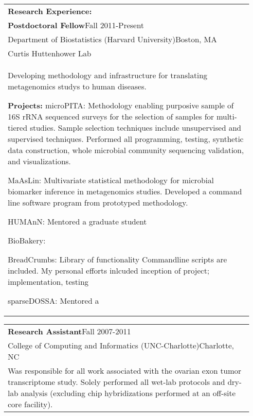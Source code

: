 \documentclass[12pt]{report}
\def\fullLength{6.5in}
\begin{document}
\begin{table}[!ht]
\begin{tabular}{p{\fullLength}}
\textbf{\Large Research Experience:}\\
\textbf{Postdoctoral Fellow}\hfill Fall 2011-Present\\
Department of Biostatistics (Harvard University)\hfill Boston, MA\\
Curtis Huttenhower Lab\\
Developing methodology and infrastructure for translating metagenomics studys to human diseases.

\textbf{Projects: }
microPITA: Methodology enabling purposive sample of 16S rRNA sequenced surveys for the selection of samples for multi-tiered studies. Sample selection techniques include unsupervised and supervised techniques. Performed all programming, testing,  synthetic data construction, whole microbial community sequencing validation, and visualizations.

MaAsLin: Multivariate statistical methodology for microbial biomarker inference in metagenomics studies. Developed a command line software program from prototyped methodology.

HUMAnN: Mentored a graduate student

BioBakery: 

BreadCrumbs: Library of functionality Commandline scripts are included. My personal efforts inlcuded inception of project; implementation, testing

sparseDOSSA: Mentored a 

\end{tabular}
\end{table}

\begin{table}[!ht]
\begin{tabular}{p{\fullLength}}
\textbf{Research Assistant}\hfill Fall 2007-2011\\
College of Computing and Informatics (UNC-Charlotte)\hfill Charlotte, NC\\
Was responsible for all work associated with the ovarian exon tumor transcriptome study. Solely performed all wet-lab protocols and dry-lab analysis (excluding chip hybridizations performed at an off-site core facility).
\end{tabular}
\end{table}

\section*{ }
\begin{spacing}{0.9}
\end{spacing}
\end{document}
